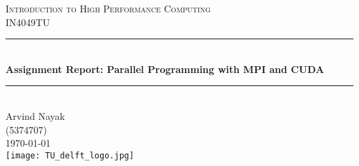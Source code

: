 \begin{titlepage}

\newcommand{\HRule}{\rule{\linewidth}{0.5mm}} 							%
\center 
 
\textsc{\Large Introduction to High Performance Computing}\\[0.2cm]
\textsc{\large IN4049TU}\\[5cm] 										%
\HRule \\[0.8cm]
{ \Large \bfseries Assignment Report: Parallel Programming with MPI and CUDA}\\[0.7cm]								%
\HRule \\[2cm]
\Large Arvind Nayak\\ (5374707)\\[1.5cm]													%
{\large \today}\\[5cm]
\texttt{[image: TU\_delft\_logo.jpg]}\\[1cm] 	%
\vfill 
\end{titlepage}
